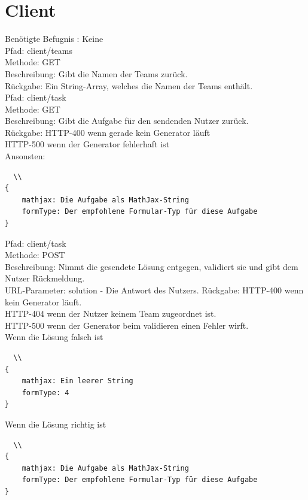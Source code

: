 \section{Client}

Benötigte Befugnis : Keine \\

\noindent Pfad: client/teams \\
Methode: GET \\
Beschreibung: Gibt die Namen der Teams zurück. \\
Rückgabe: Ein String-Array, welches die Namen der Teams enthält. \\

\noindent Pfad: client/task \\
Methode: GET \\
Beschreibung: Gibt die Aufgabe für den sendenden Nutzer zurück. \\
Rückgabe: HTTP-400 wenn gerade kein Generator läuft \\
HTTP-500 wenn der Generator fehlerhaft ist \\
Ansonsten: \begin{lstlisting}  \\
{
	mathjax: Die Aufgabe als MathJax-String
	formType: Der empfohlene Formular-Typ für diese Aufgabe
}
\end{lstlisting}

\noindent Pfad: client/task \\
Methode: POST \\
Beschreibung: Nimmt die gesendete Lösung entgegen, validiert sie und gibt dem Nutzer Rückmeldung. \\
URL-Parameter: solution - Die Antwort des Nutzers.
Rückgabe: HTTP-400 wenn kein Generator läuft. \\
HTTP-404 wenn der Nutzer keinem Team zugeordnet ist. \\
HTTP-500 wenn der Generator beim validieren einen Fehler wirft. \\
Wenn die Lösung falsch ist \begin{lstlisting}  \\
{
	mathjax: Ein leerer String
	formType: 4
}
\end{lstlisting}
Wenn die Lösung richtig ist \begin{lstlisting}  \\
{
	mathjax: Die Aufgabe als MathJax-String
	formType: Der empfohlene Formular-Typ für diese Aufgabe
}
\end{lstlisting}


